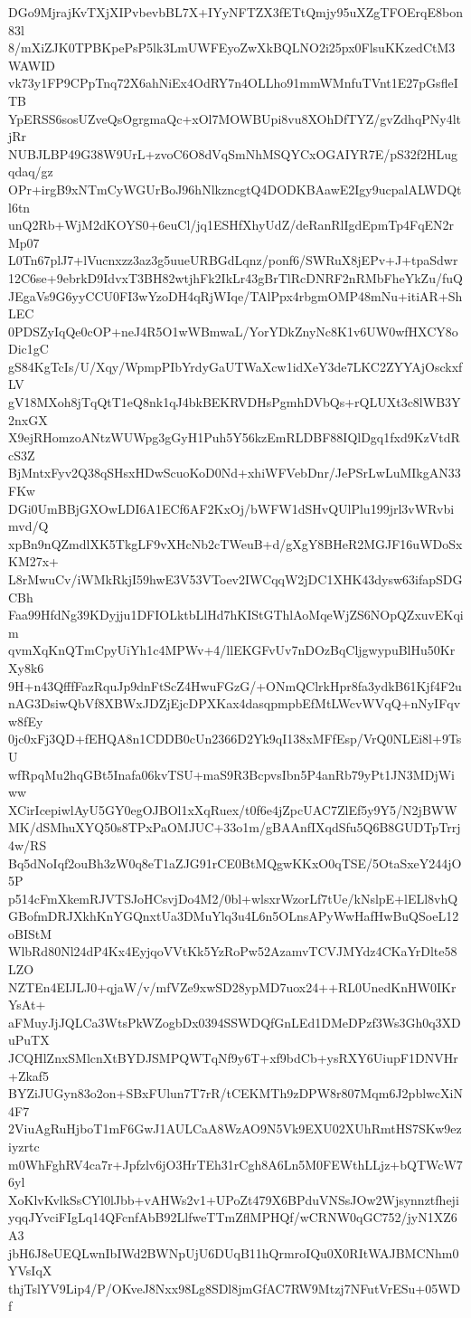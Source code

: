 DGo9MjrajKvTXjXIPvbevbBL7X+IYyNFTZX3fETtQmjy95uXZgTFOErqE8bon83l
8/mXiZJK0TPBKpePsP5lk3LmUWFEyoZwXkBQLNO2i25px0FlsuKKzedCtM3WAWID
vk73y1FP9CPpTnq72X6ahNiEx4OdRY7n4OLLho91mmWMnfuTVnt1E27pGsfleITB
YpERSS6sosUZveQsOgrgmaQc+xOl7MOWBUpi8vu8XOhDfTYZ/gvZdhqPNy4ltjRr
NUBJLBP49G38W9UrL+zvoC6O8dVqSmNhMSQYCxOGAIYR7E/pS32f2HLugqdaq/gz
OPr+irgB9xNTmCyWGUrBoJ96hNlkzncgtQ4DODKBAawE2Igy9ucpalALWDQtl6tn
unQ2Rb+WjM2dKOYS0+6euCl/jq1ESHfXhyUdZ/deRanRlIgdEpmTp4FqEN2rMp07
L0Tn67plJ7+lVucnxzz3az3g5uueURBGdLqnz/ponf6/SWRuX8jEPv+J+tpaSdwr
12C6se+9ebrkD9IdvxT3BH82wtjhFk2IkLr43gBrTlRcDNRF2nRMbFheYkZu/fuQ
JEgaVs9G6yyCCU0FI3wYzoDH4qRjWIqe/TAlPpx4rbgmOMP48mNu+itiAR+ShLEC
0PDSZyIqQe0cOP+neJ4R5O1wWBmwaL/YorYDkZnyNc8K1v6UW0wfHXCY8oDic1gC
gS84KgTcIs/U/Xqy/WpmpPIbYrdyGaUTWaXcw1idXeY3de7LKC2ZYYAjOsckxfLV
gV18MXoh8jTqQtT1eQ8nk1qJ4bkBEKRVDHsPgmhDVbQs+rQLUXt3c8lWB3Y2nxGX
X9ejRHomzoANtzWUWpg3gGyH1Puh5Y56kzEmRLDBF88IQlDgq1fxd9KzVtdRcS3Z
BjMntxFyv2Q38qSHsxHDwScuoKoD0Nd+xhiWFVebDnr/JePSrLwLuMIkgAN33FKw
DGi0UmBBjGXOwLDI6A1ECf6AF2KxOj/bWFW1dSHvQUlPlu199jrl3vWRvbimvd/Q
xpBn9nQZmdlXK5TkgLF9vXHcNb2cTWeuB+d/gXgY8BHeR2MGJF16uWDoSxKM27x+
L8rMwuCv/iWMkRkjI59hwE3V53VToev2IWCqqW2jDC1XHK43dysw63ifapSDGCBh
Faa99HfdNg39KDyjju1DFIOLktbLlHd7hKIStGThlAoMqeWjZS6NOpQZxuvEKqim
qvmXqKnQTmCpyUiYh1c4MPWv+4/llEKGFvUv7nDOzBqCljgwypuBlHu50KrXy8k6
9H+n43QfffFazRquJp9dnFtScZ4HwuFGzG/+ONmQClrkHpr8fa3ydkB61Kjf4F2u
nAG3DsiwQbVf8XBWxJDZjEjcDPXKax4dasqpmpbEfMtLWcvWVqQ+nNyIFqvw8fEy
0jc0xFj3QD+fEHQA8n1CDDB0cUn2366D2Yk9qI138xMFfEsp/VrQ0NLEi8l+9TsU
wfRpqMu2hqGBt5Inafa06kvTSU+maS9R3BcpvsIbn5P4anRb79yPt1JN3MDjWiww
XCirIcepiwlAyU5GY0egOJBOl1xXqRuex/t0f6e4jZpcUAC7ZlEf5y9Y5/N2jBWW
MK/dSMhuXYQ50s8TPxPaOMJUC+33o1m/gBAAnfIXqdSfu5Q6B8GUDTpTrrj4w/RS
Bq5dNoIqf2ouBh3zW0q8eT1aZJG91rCE0BtMQgwKKxO0qTSE/5OtaSxeY244jO5P
p514cFmXkemRJVTSJoHCsvjDo4M2/0bl+wlsxrWzorLf7tUe/kNslpE+lELl8vhQ
GBofmDRJXkhKnYGQnxtUa3DMuYlq3u4L6n5OLnsAPyWwHafHwBuQSoeL12oBIStM
WlbRd80Nl24dP4Kx4EyjqoVVtKk5YzRoPw52AzamvTCVJMYdz4CKaYrDlte58LZO
NZTEn4EIJLJ0+qjaW/v/mfVZe9xwSD28ypMD7uox24++RL0UnedKnHW0IKrYsAt+
aFMuyJjJQLCa3WtsPkWZogbDx0394SSWDQfGnLEd1DMeDPzf3Ws3Gh0q3XDuPuTX
JCQHlZnxSMlcnXtBYDJSMPQWTqNf9y6T+xf9bdCb+ysRXY6UiupF1DNVHr+Zkaf5
BYZiJUGyn83o2on+SBxFUlun7T7rR/tCEKMTh9zDPW8r807Mqm6J2pblwcXiN4F7
2ViuAgRuHjboT1mF6GwJ1AULCaA8WzAO9N5Vk9EXU02XUhRmtHS7SKw9eziyzrtc
m0WhFghRV4ca7r+Jpfzlv6jO3HrTEh31rCgh8A6Ln5M0FEWthLLjz+bQTWcW76yl
XoKlvKvlkSsCYl0lJbb+vAHWs2v1+UPoZt479X6BPduVNSsJOw2Wjsynnztfheji
yqqJYvciFIgLq14QFcnfAbB92LlfweTTmZflMPHQf/wCRNW0qGC752/jyN1XZ6A3
jbH6J8eUEQLwnIbIWd2BWNpUjU6DUqB11hQrmroIQu0X0RItWAJBMCNhm0YVsIqX
thjTslYV9Lip4/P/OKveJ8Nxx98Lg8SDl8jmGfAC7RW9Mtzj7NFutVrESu+05WDf
